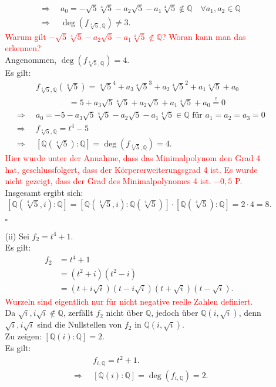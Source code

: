 \documentclass[12pt]{article}
\newcommand{\corr}[1]{\textcolor{red}{#1}}
\newcommand{\QED}{\begin{flushright} $\square$ \end{flushright}}
\newcommand{\df}{\enspace\Longrightarrow\enspace}
\newcommand{\grad}{\operatorname{deg}}
\begin{document}
\begin{enumerate}
\begin{enumerate}
\begin{align*}
			\df &a_0=-\sqrt{5}\sqrt[4]{5}-a_2\sqrt{5}-a_1\sqrt[4]{5}\notin\mathbb{Q}\quad\forall a_1,a_2\in\mathbb{Q} \\
			\df &\grad(f_{\sqrt[4]{5},\mathbb{Q}})\neq3.
		\end{align*}
\corr{Warum gilt $-\sqrt{5}\sqrt[4]{5}-a_2\sqrt{5}-a_1\sqrt[4]{5}\notin\mathbb{Q}$? Woran kann man das erkennen?}\\
		Angenommen, $\grad(f_{\sqrt[4]{5},\mathbb{Q}})=4$. \\
		Es gilt:
		\begin{align*}
			&f_{\sqrt[4]{5},\mathbb{Q}}(\sqrt[4]{5})=\sqrt[4]{5}^4+a_3\sqrt[4]{5}^3+a_2\sqrt[4]{5}^2+a_1\sqrt[4]{5}+a_0 \\
			&\quad\quad\quad\quad=5+a_3\sqrt{5}\sqrt[4]{5}+a_2\sqrt{5}+a_1\sqrt[4]{5}+a_0\overset{!}{=}0 \\
			\df &a_0=-5-a_3\sqrt{5}\sqrt[4]{5}-a_2\sqrt{5}-a_1\sqrt[4]{5}\in\mathbb{Q}\text{ für }a_1=a_2=a_3=0 \\
			\df &f_{\sqrt[4]{5},\mathbb{Q}}=t^4-5 \\
			\df &[\mathbb{Q}(\sqrt[4]{5}):\mathbb{Q}]=\grad(f_{\sqrt[4]{5},\mathbb{Q}})=4.
		\end{align*}
\corr{Hier wurde unter der Annahme, dass das Minimalpolynom den Grad 4 hat, geschlussfolgert, dass der Körpererweiterungsgrad 4 ist. Es wurde nicht gezeigt, dass der Grad des Minimalpolynomes 4 ist. $-0,5$ P.}\\
		Insgesamt ergibt sich: $$[\mathbb{Q}(\sqrt[4]{5},i):\mathbb{Q}]=[\mathbb{Q}(\sqrt[4]{5},i):\mathbb{Q}(\sqrt[4]{5})]\cdot[\mathbb{Q}(\sqrt[4]{5}):\mathbb{Q}]=2\cdot4=8.$$
		\QED
		
		\item[(ii)] Sei $f_2=t^4+1$. \\
		Es gilt:
		\begin{align*}
			f_2&=t^4+1 \\
			&=(t^2+i)(t^2-i) \\
			&=(t+i\sqrt{i})(t-i\sqrt{i})(t+\sqrt{i})(t-\sqrt{i}).
		\end{align*}
\corr{Wurzeln sind eigentlich nur für nicht negative reelle Zahlen definiert.}\\
		Da $\sqrt{i},i\sqrt{i}\notin\mathbb{Q}$, zerfällt $f_2$ nicht über $\mathbb{Q}$, jedoch über $\mathbb{Q}(i,\sqrt{i})$, denn  $\sqrt{i},i\sqrt{i}$ sind die Nullstellen von $f_2$ in $\mathbb{Q}(i,\sqrt{i})$. \\
		
		Zu zeigen: $[\mathbb{Q}(i):\mathbb{Q}]=2$. \\
		Es gilt:
		\begin{align*}
			&f_{i,\mathbb{Q}}=t^2+1. \\
			\df &[\mathbb{Q}(i):\mathbb{Q}]=\grad(f_{i,\mathbb{Q}})=2.
		\end{align*}
		

\end{enumerate}
\end{enumerate}
\end{document}
